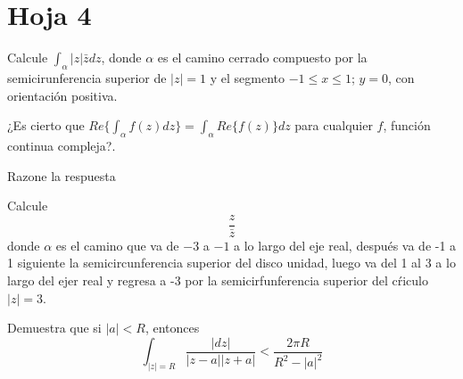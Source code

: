 \section{Hoja 4}

\begin{problem}[1]
Calcule $\int_α |z|\bar{z}dz$, donde $α$ es el camino cerrado compuesto por la semicirunferencia superior de $|z|=1$ y el segmento $-1\leq x \leq 1$; $y=0$, con orientación positiva.

\solution
\end{problem}

\begin{problem}[2]
¿Es cierto que $Re\{\int_α f(z) dz\} = \int_α Re\{f(z)\}dz$ para cualquier $f$, función continua compleja?.

Razone la respuesta
\solution
\end{problem}

\begin{problem}[3]
Calcule
\[\frac{z}{\bar{z}}\]
donde $α$ es el camino que va de $-3$ a $-1$ a lo largo del eje real, después va de -1 a 1 siguiente la semicircunferencia superior del disco unidad, luego va del 1 al 3 a lo largo del ejer real y regresa a -3 por la semicirfunferencia superior del cŕiculo $|z|=3$.

\solution

\end{problem}

\begin{problem}[4]
Demuestra que si $|a|<R$, entonces
\[\int_{|z|=R} \frac{|dz|}{|z-a||z+a|} < \frac{2π R}{R^2-|a|^2}\]

\solution
\end{problem}